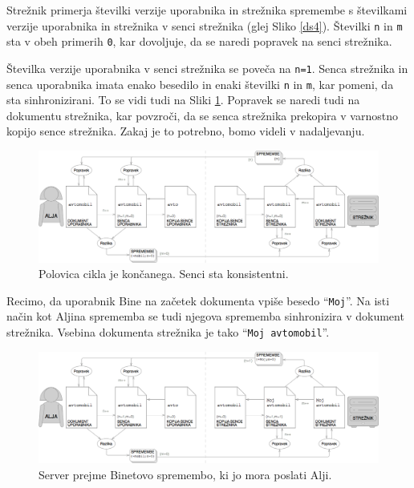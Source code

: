 \documentclass[a4paper, 12pt, twoside]{book}
\begin{document}
Strežnik primerja številki verzije uporabnika in strežnika spremembe s številkami verzije uporabnika in strežnika v senci strežnika (glej Sliko \ref{ds4}). Številki {\tt n} in {\tt m} sta v obeh primerih {\tt 0}, kar dovoljuje, da se naredi popravek na senci strežnika.

\pagebreak

Številka verzije uporabnika v senci strežnika se poveča na {\tt n=1}. Senca strežnika in senca uporabnika imata enako besedilo in enaki številki {\tt n} in {\tt m}, kar pomeni, da sta sinhronizirani. To se vidi tudi na Sliki \ref{ds5}. Popravek se naredi tudi na dokumentu strežnika, kar povzroči, da se senca strežnika prekopira v varnostno kopijo sence strežnika. Zakaj je to potrebno, bomo videli v nadaljevanju.

\begin{figure}[placement h]
\begin{center}
\includegraphics[width=16cm]{ds5.png}
\end{center}
\caption{Polovica cikla je končanega. Senci sta konsistentni.}
\label{ds5}
\end{figure}

Recimo, da uporabnik Bine na začetek dokumenta vpiše besedo “{\tt Moj}”. Na isti način kot Aljina sprememba se tudi njegova sprememba sinhronizira v dokument strežnika. Vsebina dokumenta strežnika je tako “{\tt Moj avtomobil}”.

\begin{figure}[placement h]
\begin{center}
\includegraphics[width=16cm]{ds6.png}
\end{center}
\caption{Server prejme Binetovo spremembo, ki jo mora poslati Alji.}
\label{ds6}
\end{figure}
\end{document}
